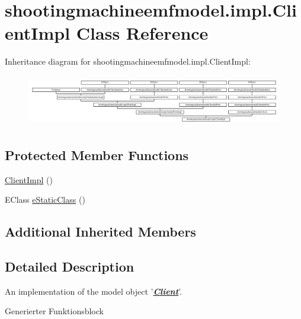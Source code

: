 \hypertarget{classshootingmachineemfmodel_1_1impl_1_1_client_impl}{\section{shootingmachineemfmodel.\-impl.\-Client\-Impl Class Reference}
\label{classshootingmachineemfmodel_1_1impl_1_1_client_impl}
}
Inheritance diagram for shootingmachineemfmodel.\-impl.\-Client\-Impl\-:\begin{figure}[H]
\begin{center}
\leavevmode
\includegraphics[height=2.247492cm]{classshootingmachineemfmodel_1_1impl_1_1_client_impl}
\end{center}
\end{figure}
\subsection*{Protected Member Functions}
\begin{DoxyCompactItemize}
\item 
\hyperlink{classshootingmachineemfmodel_1_1impl_1_1_client_impl_a42b8e3f69370e4239b8f3b38be33cd21}{Client\-Impl} ()
\item 
E\-Class \hyperlink{classshootingmachineemfmodel_1_1impl_1_1_client_impl_a77e6bb74131453d213c81e45ace87d6f}{e\-Static\-Class} ()
\end{DoxyCompactItemize}
\subsection*{Additional Inherited Members}


\subsection{Detailed Description}
An implementation of the model object '{\itshape {\bfseries \hyperlink{interfaceshootingmachineemfmodel_1_1_client}{Client}}}'.

Generierter Funktionsblock 

